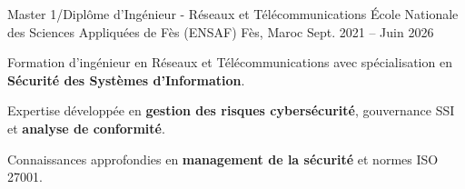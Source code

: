 
\begin{cventries}

    \cventry
    {Master 1/Diplôme d'Ingénieur - Réseaux et Télécommunications} %
    {École Nationale des Sciences Appliquées de Fès (ENSAF)} %
    {Fès, Maroc} %
    {Sept. 2021 – Juin 2026} %
    {
        \begin{cvitems} %
            \item {Formation d'ingénieur en Réseaux et Télécommunications avec spécialisation en \textbf{Sécurité des Systèmes d'Information}.}
            \item {Expertise développée en \textbf{gestion des risques cybersécurité}, gouvernance SSI et \textbf{analyse de conformité}.}
            \item {Connaissances approfondies en \textbf{management de la sécurité} et normes ISO 27001.}
        \end{cvitems}
    }
\end{cventries}